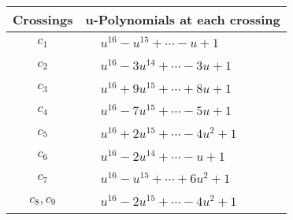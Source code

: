 \documentclass[1p]{elsarticle_modified}
\theoremstyle{definition}
\begin{document}
\begin{tabular}{m{50pt}|m{274pt}}
Crossings & \hspace{64pt}u-Polynomials at each crossing \\
\hline $$\begin{aligned}c_{1}\end{aligned}$$&$\begin{aligned}
&u^{16}- u^{15}+\cdots- u+1
\end{aligned}$\\
\hline $$\begin{aligned}c_{2}\end{aligned}$$&$\begin{aligned}
&u^{16}-3 u^{14}+\cdots-3 u+1
\end{aligned}$\\
\hline $$\begin{aligned}c_{3}\end{aligned}$$&$\begin{aligned}
&u^{16}+9 u^{15}+\cdots+8 u+1
\end{aligned}$\\
\hline $$\begin{aligned}c_{4}\end{aligned}$$&$\begin{aligned}
&u^{16}-7 u^{15}+\cdots-5 u+1
\end{aligned}$\\
\hline $$\begin{aligned}c_{5}\end{aligned}$$&$\begin{aligned}
&u^{16}+2 u^{15}+\cdots-4 u^2+1
\end{aligned}$\\
\hline $$\begin{aligned}c_{6}\end{aligned}$$&$\begin{aligned}
&u^{16}-2 u^{14}+\cdots- u+1
\end{aligned}$\\
\hline $$\begin{aligned}c_{7}\end{aligned}$$&$\begin{aligned}
&u^{16}- u^{15}+\cdots+6 u^2+1
\end{aligned}$\\
\hline $$\begin{aligned}c_{8},c_{9}\end{aligned}$$&$\begin{aligned}
&u^{16}-2 u^{15}+\cdots-4 u^2+1
\end{aligned}$\\

\end{tabular}
\end{document}
